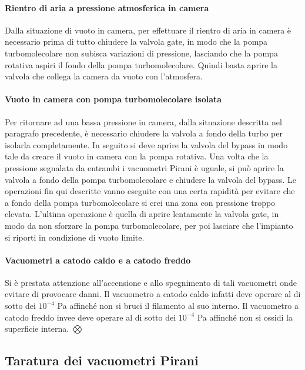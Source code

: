 \paragraph{Rientro di aria a pressione atmosferica in camera\\}
Dalla situazione di vuoto in camera, per effettuare il rientro di aria in camera è necessario prima di tutto chiudere la valvola gate, in modo che la pompa turbomolecolare non subisca variazioni di pressione, lasciando che la pompa rotativa aspiri il fondo della pompa turbomolecolare. Quindi basta aprire la valvola che collega la camera da vuoto con l'atmosfera.
\paragraph{Vuoto in camera con pompa turbomolecolare isolata\\} %
Per ritornare ad una bassa pressione in camera, dalla situazione descritta nel paragrafo precedente, è necessario chiudere la valvola a fondo della turbo per isolarla completamente. In seguito si deve aprire la valvola del bypass in modo tale da creare il vuoto in camera con la pompa rotativa. Una volta che la pressione segnalata da entrambi i vacuometri Pirani è uguale, si può aprire la valvola a fondo della pompa turbomolecolare e chiudere la valvola del bypass. Le operazioni fin qui descritte vanno eseguite con una certa rapidità per evitare che a fondo della pompa turbomolecolare si crei una zona con pressione troppo elevata. L'ultima operazione è quella di aprire lentamente la valvola gate, in modo da non sforzare la pompa turbomolecolare, per poi lasciare che l'impianto si riporti in condizione di vuoto limite. %
\paragraph{Vacuometri a catodo caldo e a catodo freddo\\}
Si è prestata attenzione all'accensione e allo spegnimento di tali vacuometri onde evitare di provocare danni. Il vacuometro a catodo caldo infatti deve operare al di sotto dei $10^{-4}$ \si{\pascal} affinché non si bruci il filamento al suo interno. Il vacuometro a catodo freddo invee deve operare al di sotto dei $10^{-4}$ \si{\pascal} affinché non si ossidi la superficie interna. $\bigotimes$ %

\subsection{Taratura dei vacuometri Pirani}

